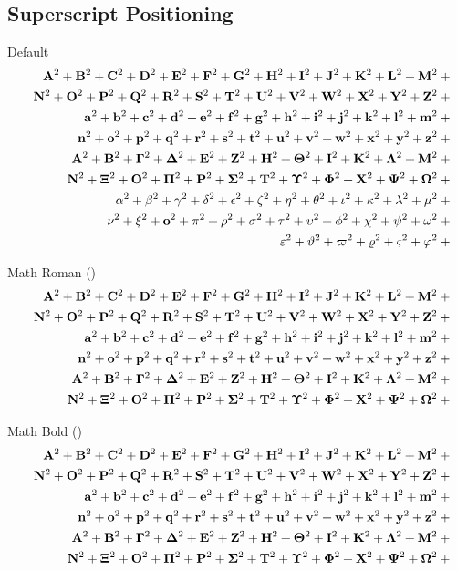 \documentclass[12pt, a4paper, oneside]{article}
\theoremstyle{Plain}
\theoremstyle{Definition}
\theoremstyle{Remark}
\begin{document}
\begin{appendix}
\subsection{Superscript Positioning \showfamily}

Default
\def\test#1{#1^{2}+{}}%
\begin{eqnarray*}
  && {\testupperi}\\
  && {\testupperii}\\
  && {\testloweri}\\
  && {\testlowerii}\\
  && {\testupgreeki}\\
  && {\testupgreekii}\\
  && {\testlowgreeki}\\
  && {\testlowgreekii}\\
  && {\testlowgreekiii}
\end{eqnarray*}%

Math Roman (\texttt{\string\mathrm})
\def\test#1{\mathrm{#1}^{2}+{}}%
\begin{eqnarray*}
  && {\testupperi}\\
  && {\testupperii}\\
  && {\testloweri}\\
  && {\testlowerii}\\
  && {\testupgreeki}\\
  && {\testupgreekii}
\end{eqnarray*}%


Math Bold (\texttt{\string\mathbf})
\def\test#1{\mathbf{#1}^{2}+{}}%
\begin{eqnarray*}
  && {\testupperi}\\
  && {\testupperii}\\
  && {\testloweri}\\
  && {\testlowerii}\\
  && {\testupgreeki}\\
  && {\testupgreekii}
\end{eqnarray*}


\end{appendix}
\end{document}

